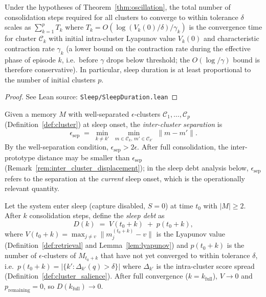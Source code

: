 \begin{corollary}
\label{cor:sleep_duration}
\leanok
{}
Under the hypotheses of Theorem~\ref{thm:oscillation}, the total number of consolidation steps required for all clusters to converge to within tolerance $\delta$ scales as $\sum_{k=1}^{p} T_k$ where $T_k = O(\log(V_k(0)/\delta) / \gamma_k)$ is the convergence time for cluster $\mathcal{C}_k$ with initial intra-cluster Lyapunov value $V_k(0)$ and characteristic contraction rate $\gamma_k$ (a lower bound on the contraction rate during the effective phase of episode $k$, i.e.\ before $\gamma$ drops below threshold; the $O(\log/\gamma)$ bound is therefore conservative).  In particular, sleep duration is at least proportional to the number of initial clusters $p$.
\end{corollary}

\begin{proof}
\leanok
{}
See Lean source: \texttt{Sleep/SleepDuration.lean}
\end{proof}

\begin{definition}
\label{def:inter_cluster_sep}
\leanok
Given a memory $M$ with well-separated $\epsilon$-clusters $\mathcal{C}_1, \ldots, \mathcal{C}_p$ (Definition~\ref{def:cluster}) at sleep onset, the \emph{inter-cluster separation} is
\[
\epsilon_{\mathrm{sep}} \;=\; \min_{k \neq k'}\;\min_{m \in \mathcal{C}_k,\, m' \in \mathcal{C}_{k'}}\;\|m - m'\|.
\]
By the well-separation condition, $\epsilon_{\mathrm{sep}} > 2\epsilon$.  After full consolidation, the inter-prototype distance may be smaller than $\epsilon_{\mathrm{sep}}$ (Remark~\ref{rem:inter_cluster_displacement}); in the sleep debt analysis below, $\epsilon_{\mathrm{sep}}$ refers to the separation at the \emph{current} sleep onset, which is the operationally relevant quantity.
\end{definition}

\begin{definition}
\label{def:sleep_debt}
\leanok
Let the system enter sleep (capture disabled, $S = 0$) at time $t_0$ with $|M| \geq 2$.  After $k$ consolidation steps, define the \emph{sleep debt} as
\[
D(k) \;=\; V(t_0 + k) \;+\; p(t_0 + k),
\]
where $V(t_0 + k) = \max_{j \neq v}\|m_j^{(t_0+k)} - v\|$ is the Lyapunov value (Definition~\ref{def:retrieval} and Lemma~\ref{lem:lyapunov}) and $p(t_0 + k)$ is the number of $\epsilon$-clusters of $M_{t_0+k}$ that have not yet converged to within tolerance $\delta$, i.e.\ $p(t_0+k) = |\{k' : \Delta_{k'}(q) > \delta\}|$ where $\Delta_{k'}$ is the intra-cluster score spread (Definition~\ref{def:cluster_salience}).  After full convergence ($k = k_{\mathrm{full}}$), $V \to 0$ and $p_{\mathrm{remaining}} = 0$, so $D(k_{\mathrm{full}}) \to 0$.
\end{definition}

